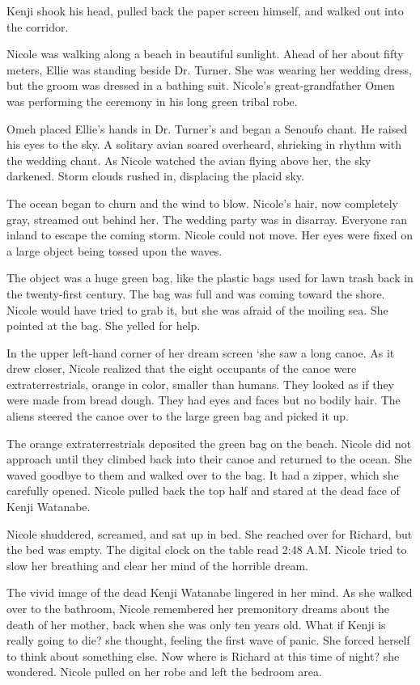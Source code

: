\documentclass[]{article}
\begin{document}
{Kenji shook his head, pulled back the paper screen himself, and walked out into the corridor.

Nicole was walking along a beach in beautiful sunlight. Ahead of her about fifty meters, Ellie was standing beside Dr. Turner. She was wearing her wedding dress, but the groom was dressed in a bathing suit. Nicole’s great-grandfather Omen was performing the ceremony in his long green tribal robe.

Omeh placed Ellie’s hands in Dr. Turner’s and began a Senoufo chant. He raised his eyes to the sky. A solitary avian soared overheard, shrieking in rhythm with the wedding chant. As Nicole watched the avian flying above her, the sky darkened. Storm clouds rushed in, displacing the placid sky.

The ocean began to churn and the wind to blow. Nicole’s hair, now completely gray, streamed out behind her. The wedding party was in disarray. Everyone ran inland to escape the coming storm. Nicole could not move. Her eyes were fixed on a large object being tossed upon the waves.

The object was a huge green bag, like the plastic bags used for lawn trash back in the twenty-first century. The bag was full and was coming toward the shore. Nicole would have tried to grab it, but she was afraid of the moiling sea. She pointed at the bag. She yelled for help.

In the upper left-hand corner of her dream screen ‘she saw a long canoe. As it drew closer, Nicole realized that the eight occupants of the canoe were extraterrestrials, orange in color, smaller than humans. They looked as if they were made from bread dough. They had eyes and faces but no bodily hair. The aliens steered the canoe over to the large green bag and picked it up.

The orange extraterrestrials deposited the green bag on the beach. Nicole did not approach until they climbed back into their canoe and returned to the ocean. She waved goodbye to them and walked over to the bag. It had a zipper, which she carefully opened. Nicole pulled back the top half and stared at the dead face of Kenji Watanabe.

Nicole shuddered, screamed, and sat up in bed. She reached over for Richard, but the bed was empty. The digital clock on the table read 2:48 A.M. Nicole tried to slow her breathing and clear her mind of the horrible dream.

The vivid image of the dead Kenji Watanabe lingered in her mind. As she walked over to the bathroom, Nicole remembered her premonitory dreams about the death of her mother, back when she was only ten years old. What if Kenji is really going to die? she thought, feeling the first wave of panic. She forced herself to think about something else. Now where is Richard at this time of night? she wondered. Nicole pulled on her robe and left the bedroom area.

}
\end{document}
